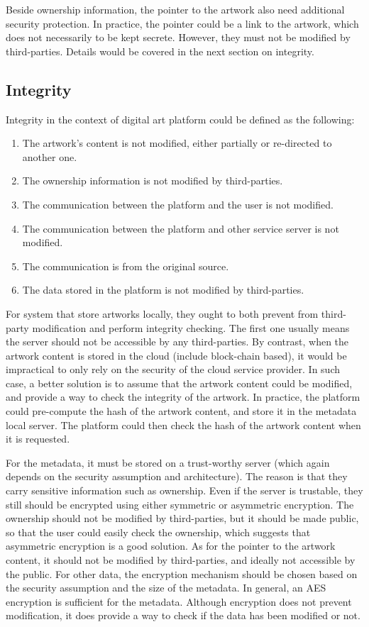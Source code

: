 Beside ownership information, the pointer to the artwork also need additional security protection. In practice, the pointer could be a link to the artwork, which does not necessarily to be kept secrete. However, they must not be modified by third-parties. Details would be covered in the next section on integrity.

\subsection{Integrity}\label{sec:integrity}

Integrity in the context of digital art platform could be defined as the following:

\begin{enumerate}
\item The artwork's content is not modified, either partially or re-directed to another one.
\item The ownership information is not modified by third-parties.
\item The communication between the platform and the user is not modified.
\item The communication between the platform and other service server is not modified.
\item The communication is from the original source.
\item The data stored in the platform is not modified by third-parties.
\end{enumerate}

For system that store artworks locally, they ought to both prevent from third-party modification and perform integrity checking. The first one usually means the server should not be accessible by any third-parties. By contrast, when the artwork content is stored in the cloud (include block-chain based), it would be impractical to only rely on the security of the cloud service provider. In such case, a better solution is to assume that the artwork content could be modified, and provide a way to check the integrity of the artwork. In practice, the platform could pre-compute the hash of the artwork content, and store it in the metadata local server. The platform could then check the hash of the artwork content when it is requested. 

For the metadata, it must be stored on a trust-worthy server (which again depends on the security assumption and architecture). The reason is that they carry sensitive information such as ownership. Even if the server is trustable, they still should be encrypted using either symmetric or asymmetric encryption. The ownership should not be modified by third-parties, but it should be made public, so that the user could easily check the ownership, which suggests that asymmetric encryption is a good solution. As for the pointer to the artwork content, it should not be modified by third-parties, and ideally not accessible by the public. For other data, the encryption mechanism should be chosen based on the security assumption and the size of the metadata. In general, an AES encryption is sufficient for the metadata. Although encryption does not prevent modification, it does provide a way to check if the data has been modified or not.

